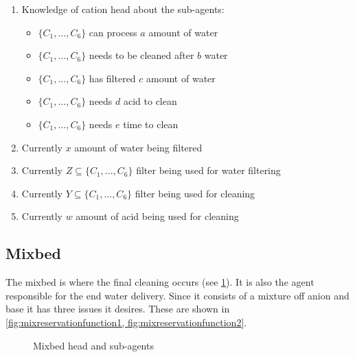 \begin{enumerate}
	\item
	Knowledge of cation head about the sub-agents:
	\begin{itemize}
		\item {$\{C_1, ..., C_6\}$ can process $a$ amount of water}
		\item {$\{C_1, ..., C_6\}$ needs to be cleaned after $b$ water}
		\item {$\{C_1, ..., C_6\}$ has filtered $c$ amount of water}
		\item {$\{C_1, ..., C_6\}$ needs $d$ acid to clean}
		\item {$\{C_1, ..., C_6\}$ needs $e$ time to clean}
	\end{itemize}
	\item
	Currently $x$ amount of water being filtered 
	\item
	Currently $Z \subseteq \{C_1, ..., C_6\}$ filter being used for water filtering
	\item
	Currently $Y \subseteq \{C_1, ..., C_6\}$ filter being used for cleaning
	\item
	Currently $w$ amount of acid being used for cleaning
\end{enumerate}

\clearpage
\subsection{Mixbed}
The mixbed is where the final cleaning occurs (see \cref{fig:mixbed-head-sub}). It is also the agent responsible for the end water delivery. Since it consists of a mixture off anion and base it has three issues it desires. These are shown in \cref{fig:mixreservationfunction1, fig:mixreservationfunction2}.


\begin{figure}[h]
	\centering
	\caption{Mixbed head and sub-agents}
	\label{fig:mixbed-head-sub}
\end{figure}


